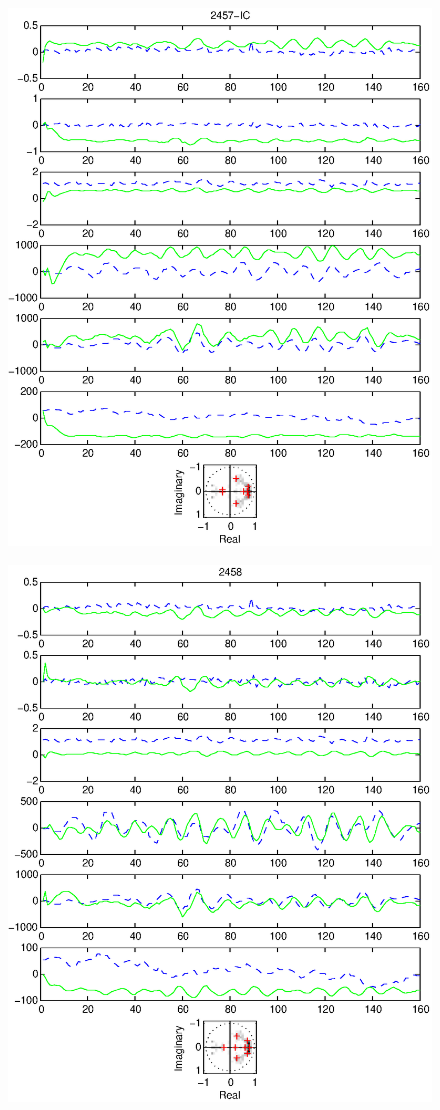 \documentclass{article}
\begin{document}
\begin{figure}[htb!]\centering
\includegraphics{2457_ic.eps}
\end{figure}\clearpage
\begin{figure}[htb!]\centering
\includegraphics{2458.eps}
\end{figure}\clearpage
\end{document}
